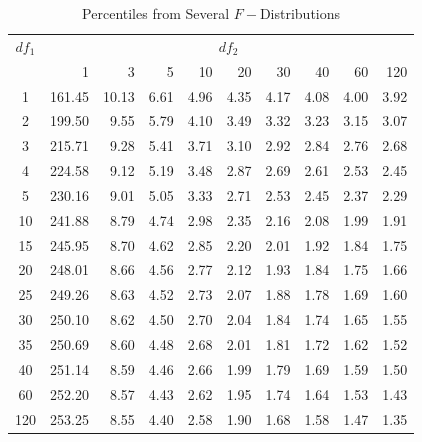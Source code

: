 \begin{table}[h]
 \caption{\label{AP:FProbTable} Percentiles from
Several $F-$Distributions}
\begin{tabular}{crrrrrrrrr}
\hline  $df_1$ & \multicolumn{9}{c}{$df_2$} \\
           &          1 &          3 &          5 &         10 &         20 &         30 &         40 &         60 &        120 \\
\hline
         1 &     161.45 &      10.13 &       6.61 &       4.96 &       4.35 &       4.17 &       4.08 &       4.00 &       3.92 \\
         2 &     199.50 &       9.55 &       5.79 &       4.10 &       3.49 &       3.32 &       3.23 &       3.15 &       3.07 \\
         3 &     215.71 &       9.28 &       5.41 &       3.71 &       3.10 &       2.92 &       2.84 &       2.76 &       2.68 \\
         4 &     224.58 &       9.12 &       5.19 &       3.48 &       2.87 &       2.69 &       2.61 &       2.53 &       2.45 \\
         5 &     230.16 &       9.01 &       5.05 &       3.33 &       2.71 &       2.53 &       2.45 &       2.37 &       2.29 \\
\hline
        10 &     241.88 &       8.79 &       4.74 &       2.98 &       2.35 &       2.16 &       2.08 &       1.99 &       1.91 \\
        15 &     245.95 &       8.70 &       4.62 &       2.85 &       2.20 &       2.01 &       1.92 &       1.84 &       1.75 \\
        20 &     248.01 &       8.66 &       4.56 &       2.77 &       2.12 &       1.93 &       1.84 &       1.75 &       1.66 \\
        25 &     249.26 &       8.63 &       4.52 &       2.73 &       2.07 &       1.88 &       1.78 &       1.69 &       1.60 \\
        30 &     250.10 &       8.62 &       4.50 &       2.70 &       2.04 &       1.84 &       1.74 &       1.65 &       1.55 \\
        35 &     250.69 &       8.60 &       4.48 &       2.68 &       2.01 &       1.81 &       1.72 &       1.62 &       1.52 \\
        40 &     251.14 &       8.59 &       4.46 &       2.66 &       1.99 &       1.79 &       1.69 &       1.59 &       1.50 \\
\hline
        60 &     252.20 &       8.57 &       4.43 &       2.62 &       1.95 &       1.74 &       1.64 &       1.53 &       1.43 \\
       120 &     253.25 &       8.55 &       4.40 &       2.58 &       1.90 &       1.68 &       1.58 &       1.47 &       1.35 \\
\hline
\end{tabular}
\end{table}

